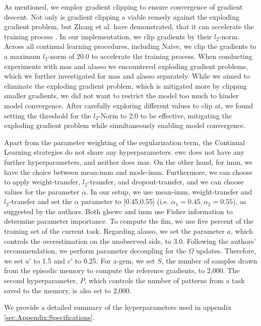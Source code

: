 As mentioned, we employ gradient clipping to ensure convergence of gradient descent. Not only is gradient clipping a viable remedy against the exploding
gradient problem, but Zhang et al. have demonstrated, that it can accelerate the training process \cite{zhang2019gradient}. In our implementation, we clip gradients by their
$l_2$-norm. Across all continual learning procedures, including Naive, we clip the gradients to a maximum $l_2$-norm of 20.0 to accelerate the training process.
When conducting experiments with \gls{mas} and \gls{alasso} we encountered exploding gradient problems, which we further investigated for \gls{mas} and \gls{alasso}
separately. While we aimed to eliminate the exploding gradient problem, which is mitigated more by clipping smaller gradients, we did not want to restrict the
model too much to hinder model convergence. After carefully exploring different values to clip at, we found setting the threshold for the $l_2$-Norm to 2.0
to be effective, mitigating the exploding gradient problem while simultaneously enabling model convergence. \par
Apart from the parameter weighting of the regularization term, the Continual Learning strategies do not share any hyperparameters. \gls{ewc} does not have
any further hyperparameters, and neither does \gls{mas}. On the other hand, for \gls{imm}, we have the choice between mean-\gls{imm} and mode-\gls{imm}. Furthermore,
we can choose to apply weight-transfer, $l_2$-transfer, and dropout-transfer, and we can choose values for the parameter $\alpha$. In our setup, we use mean-\gls{imm},
weight-transfer and $l_2$-transfer and set the $\alpha$ parameter to [0.45,0.55] (i.e. $\alpha_1 = 0.45, \alpha_2 = 0.55$), as suggested by the authors. Both gls{ewc} and
\gls{imm} use Fisher information to determine parameter importance. To compute the \gls{fim}, we use five percent of the training set of the current task.
Regarding \gls{alasso}, we set the parameter $a$, which controls the overestimation on the unobserved side, to 3.0. Following the authors' recommendation,
we perform parameter decoupling for the $\Omega$ updates. Therefore, we set $a'$ to 1.5 and $c'$ to 0.25. For \gls{a-gem}, we set $S$, the number of samples
drawn from the episodic memory to compute the reference gradients, to 2,000. The second hyperparameter, $P$, which controls the number of patterns from a task
saved to the memory, is also set to 2,000. \par
We provide a detailed summary of the hyperparameters used in appendix \ref{sec:Appendix:Specifications}.


